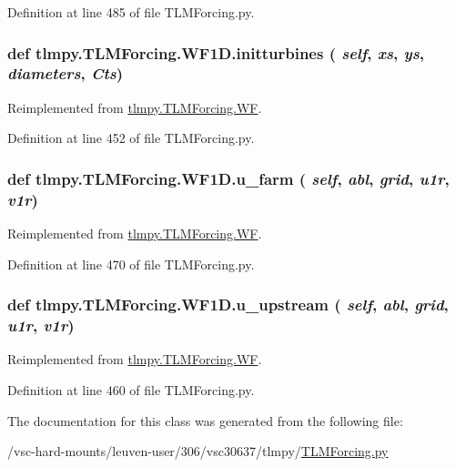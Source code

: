 Definition at line 485 of file TLMForcing.py.\hypertarget{classtlmpy_1_1TLMForcing_1_1WF1D_ad5a25d373ed339448293eee5b2845d4d}{
\subsubsection[{initturbines}]{\setlength{\rightskip}{0pt plus 5cm}def tlmpy.TLMForcing.WF1D.initturbines ( {\em self}, \/   {\em xs}, \/   {\em ys}, \/   {\em diameters}, \/   {\em Cts})}}
\label{classtlmpy_1_1TLMForcing_1_1WF1D_ad5a25d373ed339448293eee5b2845d4d}


Reimplemented from \hyperlink{classtlmpy_1_1TLMForcing_1_1WF_a3ab7aa7b283a781d8b72520592c73297}{tlmpy.TLMForcing.WF}.

Definition at line 452 of file TLMForcing.py.\hypertarget{classtlmpy_1_1TLMForcing_1_1WF1D_a540d7bd2116f611b0e169591b7efb75c}{
\subsubsection[{u\_\-farm}]{\setlength{\rightskip}{0pt plus 5cm}def tlmpy.TLMForcing.WF1D.u\_\-farm ( {\em self}, \/   {\em abl}, \/   {\em grid}, \/   {\em u1r}, \/   {\em v1r})}}
\label{classtlmpy_1_1TLMForcing_1_1WF1D_a540d7bd2116f611b0e169591b7efb75c}


Reimplemented from \hyperlink{classtlmpy_1_1TLMForcing_1_1WF_adba4afad5d7b012ddfc60ea21735d029}{tlmpy.TLMForcing.WF}.

Definition at line 470 of file TLMForcing.py.\hypertarget{classtlmpy_1_1TLMForcing_1_1WF1D_ad4e412ca5f03d828796ace1834caabcb}{
\subsubsection[{u\_\-upstream}]{\setlength{\rightskip}{0pt plus 5cm}def tlmpy.TLMForcing.WF1D.u\_\-upstream ( {\em self}, \/   {\em abl}, \/   {\em grid}, \/   {\em u1r}, \/   {\em v1r})}}
\label{classtlmpy_1_1TLMForcing_1_1WF1D_ad4e412ca5f03d828796ace1834caabcb}


Reimplemented from \hyperlink{classtlmpy_1_1TLMForcing_1_1WF_a6b3eacb0cfe133cc07990e9c9c43cf84}{tlmpy.TLMForcing.WF}.

Definition at line 460 of file TLMForcing.py.

The documentation for this class was generated from the following file:\begin{DoxyCompactItemize}
\item 
/vsc-\/hard-\/mounts/leuven-\/user/306/vsc30637/tlmpy/\hyperlink{TLMForcing_8py}{TLMForcing.py}\end{DoxyCompactItemize}

